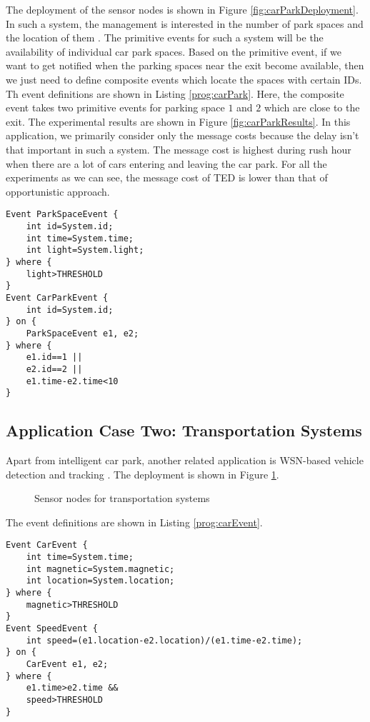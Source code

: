 The deployment of the sensor nodes is shown in Figure \ref{fig:carParkDeployment}. In such a system, the management is interested in the number of park spaces and the location of them \cite{tang:carpark}. The primitive events for such a system will be the availability of individual car park spaces. Based on the primitive event, if we want to get notified when the parking spaces near the exit become available, then we just need to define composite events which locate the spaces with certain IDs. Th event definitions are shown in Listing \ref{prog:carPark}. Here, the composite event takes two primitive events for parking space \(1\) and \(2\) which are close to the exit. The experimental results are shown in Figure \ref{fig:carParkResults}. In this application, we primarily consider only the message costs because the delay isn't that important in such a system. The message cost is highest during rush hour when there are a lot of cars entering and leaving the car park. For all the experiments as we can see, the message cost of TED is lower than that of opportunistic approach.

\begin{lstlisting}[caption=Event definition for a car park, label=prog:carPark]
Event ParkSpaceEvent {
	int id=System.id;
	int time=System.time;
	int light=System.light;
} where {
	light>THRESHOLD
}
Event CarParkEvent {
	int id=System.id;
} on {
	ParkSpaceEvent e1, e2;
} where {
	e1.id==1 ||
	e2.id==2 ||
	e1.time-e2.time<10
}
\end{lstlisting}

\subsection{Application Case Two: Transportation Systems}
Apart from intelligent car park, another related application is WSN-based vehicle detection and tracking \cite{lai:its}. The deployment is shown in Figure \ref{fig:itsSensor}.

\begin{figure}
\centering
{}
\caption{Sensor nodes for transportation systems}
\label{fig:itsSensor}
\end{figure}

The event definitions are shown in Listing \ref{prog:carEvent}.
\begin{lstlisting}[caption=Event definition for tracking vehicles, label=prog:carEvent]
Event CarEvent {
	int time=System.time;
	int magnetic=System.magnetic;
	int location=System.location;
} where {
	magnetic>THRESHOLD
}
Event SpeedEvent {
	int speed=(e1.location-e2.location)/(e1.time-e2.time);
} on {
	CarEvent e1, e2;
} where {
	e1.time>e2.time &&
	speed>THRESHOLD
}
\end{lstlisting}

